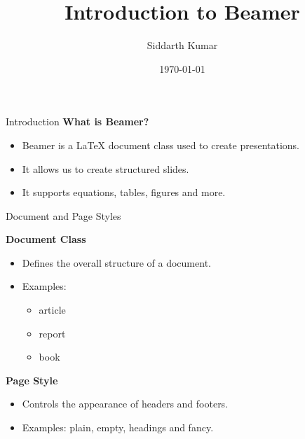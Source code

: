\documentclass{beamer}
\title{Introduction to Beamer}
\author{Siddarth Kumar}
\institute{MNIT Jaipur}
\date{\today}
\begin{document}
\begin{frame}
    \titlepage
\end{frame}

\begin{frame}{Introduction}
    \textbf{What is Beamer?}

    \begin{itemize}
        \item Beamer is a LaTeX document class used to create presentations.
        \item It allows us to create structured slides.
        \item It supports equations, tables, figures and more.
    \end{itemize}
\end{frame}
\begin{frame}{Document and Page Styles}

    \textbf{Document Class}

    \begin{itemize}
        \item Defines the overall structure of a document.
        \item Examples:
        \begin{itemize}
            \item article
            \item report
            \item book
        \end{itemize}
    \end{itemize}

    \vspace{0.3cm}

    \textbf{Page Style}

    \begin{itemize}
        \item Controls the appearance of headers and footers.
        \item Examples: plain, empty, headings and fancy.
    \end{itemize}

\end{frame}
\end{document}
